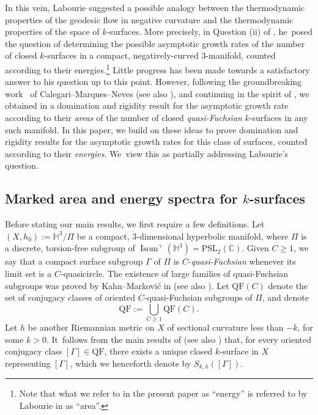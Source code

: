 \documentclass[11pt]{article}
\newcommand{\ksurface}{$k$\nobreakdash-surface\xspace}
\newcommand{\ksurfaces}{$k$\nobreakdash-surfaces\xspace}
\theoremstyle{plain}
\theoremstyle{definition}
\newcommand\PSLc{\mathrm{PSL}_2(\mathbb{C})}
\newcommand\Hyp{\mathbb{H}^3}
\newcommand{\QF}{\mathrm{QF}}
\DeclareMathOperator{\Isom}{Isom}
\begin{document}
In this vein, Labourie suggested a possible analogy between the thermodynamic properties of the geodesic flow in negative curvature and the thermodynamic properties of the space of \ksurfaces \cite{LabourieInvent,Labourie_phase_space}. More precisely, in Question (ii) of \cite[\S1.2]{LabourieInvent}, he~posed the question of determining the possible asymptotic growth rates of the number of closed \ksurfaces in a compact, negatively-curved $3$\nobreakdash-manifold, counted according to their energies.\footnote{Note that what we refer to in the present paper as ``energy'' is referred to by Labourie in \cite{LabourieInvent} as ``area''.} Little progress has been made towards a satisfactory answer to his question up to this point. However, following the groundbreaking work~\cite{CMN} of Calegari--Marques--Neves (see also \cite{LabourieBourbaki}), and continuing in the spirit of \cite{BCG}, we obtained in \cite{ALS} a domination and rigidity result for the asymptotic growth rate according to their \emph{areas} of the number of closed \emph{quasi-Fuchsian} \ksurfaces in any such manifold. In this paper, we build on these ideas to prove domination and rigidity results for the asymptotic growth rates for this class of surfaces, counted according to their \textit{energies}. We~view this as partially addressing Labourie's question.

\subsection{Marked area and energy spectra for \ksurfaces}

Before stating our main results, we first require a few definitions. Let $(X,h_0):=\Hyp/\Pi$ be a compact, $3$\nobreakdash-dimensional hyperbolic manifold, where $\Pi$ is a discrete, torsion-free subgroup of $\Isom^+(\Hyp)=\PSLc$. Given $C\geq 1$, we say that a compact surface subgroup $\Gamma$ of $\Pi$ is $C$-\emph{quasi-Fuchsian} whenever its limit set is a $C$-quasicircle. The existence of large families of quasi-Fuchsian subgroups was proved by Kahn--Markovi\'c in \cite{KM1,KM2} (see also \cite{HamenstadtKM,Kahn_Labourie_Mozes}). Let $\QF(C)$ denote the set of conjugacy classes of oriented $C$-quasi-Fuchsian subgroups of $\Pi$, and denote
\begin{equation*}
\QF:=\bigcup_{C\geq 1}\QF(C).
\end{equation*}
Let $h$ be another Riemannian metric on $X$ of sectional curvature less than $-k$, for some $k>0$. It~follows from the main results of \cite{LabourieInvent} (see also \cite{Smith_asymp}) that, for every oriented conjugacy class $[\Gamma]\in\QF$, there exists a unique closed \ksurface in $X$ representing $[\Gamma]$, which we henceforth denote by $S_{k,h}([\Gamma])$.
\end{document}
